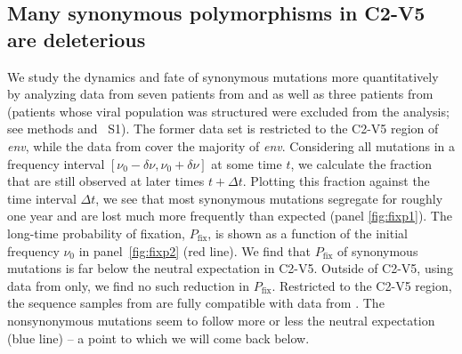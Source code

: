 \documentclass[rmp, twocolumn]{revtex4}
\newcommand{\pfix}{P_{\mathrm{fix}}}
\newcommand{\env}{\textit{env}}
\newcommand{\shankaregion}{C2-V5}
\newcommand{\PCApat}{1}
\begin{document}
\subsection{Many synonymous polymorphisms in \shankaregion{} are deleterious}
We study the dynamics and fate of synonymous mutations more quantitatively by
analyzing data from seven patients from
\citet{shankarappa_consistent_1999} and \citep{liu_selection_2006} as well as three patients from
\citet{bunnik_autologous_2008} (patients whose viral population was structured
were excluded from the analysis; see methods and \figurename~S\PCApat).  The
former data set is restricted to the \shankaregion{} region of \env, while
the data from \citet{bunnik_autologous_2008} cover the majority of \env.
Considering all mutations in a frequency interval $[\nu_0-\delta\nu, \nu_0+\delta\nu]$ at some time
$t$, we calculate the fraction that are still observed at later times $t+\Delta t$. Plotting this fraction against the time interval $\Delta t$, we see that
most synonymous mutations segregate for roughly one year and are lost much more
frequently than expected (panel \ref{fig:fixp1}). The long-time probability of
fixation, $\pfix$, is shown as a function of the
initial frequency $\nu_0$ in panel~\ref{fig:fixp2} (red line). 
We find that $\pfix$ of synonymous mutations is far below
the neutral expectation in  \shankaregion.  Outside of \shankaregion, using data from
\citet{bunnik_autologous_2008} only, we find no such reduction in $\pfix$.
Restricted to the \shankaregion{} region, the sequence samples from
\citet{bunnik_autologous_2008} are fully compatible with data from
\citet{shankarappa_consistent_1999}. The nonsynonymous mutations seem to follow
more or less the neutral expectation (blue line) -- a point to which we will
come back below.
\end{document}
